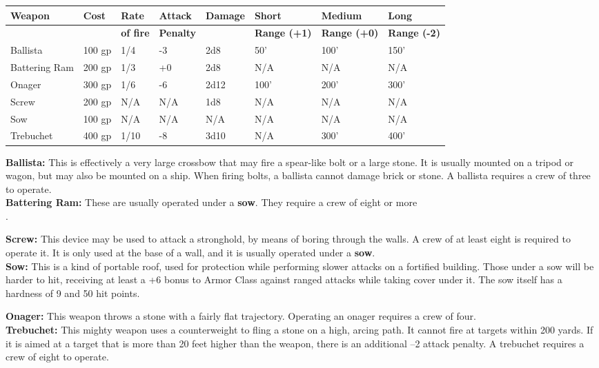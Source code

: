 \documentclass[a4paper,twoside,openany,10pt]{book}
\begin{document}
\begin{tabular*}{1\linewidth}{@{\extracolsep{\fill}}llllllll}
\multirow{2}{*}{\textbf{Weapon}}&\textbf{Cost}&\textbf{Rate}&\textbf{Attack}&\textbf{Damage}&\textbf{Short}&\textbf{Medium} & \textbf{Long}\\\toprule
&&\textbf{of fire}&\textbf{Penalty}&&\textbf{Range (+1)}&\textbf{Range (+0)}&\textbf{Range (-2)}\\\hline
Ballista & 100 gp & 1/4 & -3 & 2d8 & 50' & 100' & 150' \\\hline
Battering Ram & 200 gp & 1/3 & +0 & 2d8 & N/A & N/A & N/A \\\hline
Onager & 300 gp & 1/6 & -6 & 2d12 & 100'{} &200'{} & 300'{} \\\hline
Screw & 200 gp & N/A & N/A & 1d8 & N/A & N/A & N/A \\\hline
Sow & 100 gp & N/A & N/A & N/A & N/A & N/A & N/A \\\hline
Trebuchet & 400 gp & 1/10 & -8 & 3d10 & N/A & 300' & 400'{} \\\bottomrule
\end{tabular*}\vfill

\begin{multicols}{2}

\bigskip

\textbf{Ballista:} This is effectively a very large crossbow that may fire a spear-like bolt or a large stone. It is usually mounted on a tripod or wagon, but may also be mounted on a ship. When firing bolts, a ballista cannot damage brick or stone. A ballista requires a crew of three to operate.\\

\textbf{Battering Ram:} These are usually operated under a \textbf{sow}. They require a crew of eight or more\\.

\textbf{Screw:} This device may be used to attack a stronghold, by means of boring through the walls. A crew of at least eight is required to operate it. It is only used at the base of a wall, and it is usually operated under a \textbf{sow}.\\

\textbf{Sow:} This is a kind of portable roof, used for protection while performing slower attacks on a fortified building. Those under a sow will be harder to hit, receiving at least a +6 bonus to Armor Class against ranged attacks while taking cover under it. The sow itself has a hardness of 9 and 50 hit points.\

\textbf{Onager:} This weapon throws a stone with a fairly flat trajectory. Operating an onager requires a crew of four.\\

\textbf{Trebuchet:} This mighty weapon uses a counterweight to fling a stone on a high, arcing path. It cannot fire at targets within 200 yards. If it is aimed at a target that is more than 20 feet higher than the weapon, there is an additional --2 attack penalty. A trebuchet requires a crew of eight to operate.

\end{multicols}
\end{document}

